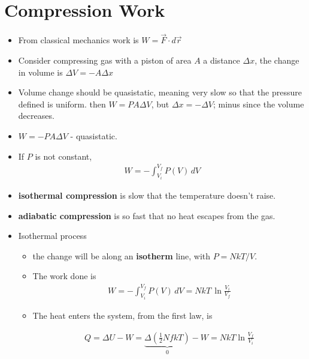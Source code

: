 \documentclass{book}
\begin{document}
\section{Compression Work}%
\label{sec:Compression Work}

\begin{itemize}
	\item From classical mechanics work is $W = \vec{F} \cdot d\vec{r}$
	\item  Consider compressing gas with a piston of area $A$ a distance $\Delta{x}$,
	      the change in volume is $\Delta{V} = -A \Delta{x}$
	\item Volume change should be quasistatic, meaning very slow so that the pressure defined is uniform.
	      then $W = P A \Delta{V}$, but $\Delta{x} = - \Delta{V}$; minus since the volume decreases.
	\item $W =- P A \Delta{V}$  -  quasistatic.
	\item If $P$ is not constant,
	      \begin{align}
		      \label{eq:gas work}
		      W = - \int_{V_i}^{V_f} P(V) \, dV
	      \end{align}

	\item \textbf{isothermal compression} is slow that the temperature doesn't raise.
	\item \textbf{adiabatic compression} is so fast that no heat escapes from the gas.
	\item Isothermal process
	      \begin{itemize}
		      \item  the change will be along an \textbf{ isotherm } line,
		            with $P = NkT / V$.
		      \item The work done is
		            \begin{align}
			            W  = - \int_{V_i}^{V_f} P(V) \, dV = NkT \, \ln{ \frac{V_{i}}{V_{f}} }
		            \end{align}
		      \item The heat enters the system, from the first law, is

		            \begin{align}
			            Q = \Delta{U} - W = \underbrace{ \Delta{( \frac{1}{2}NfkT )} }_{0} - W = NkT \ln{\frac{V_{f}}{V_{i}}}
		            \end{align}
	      \end{itemize}


\end{itemize}
\end{document}
